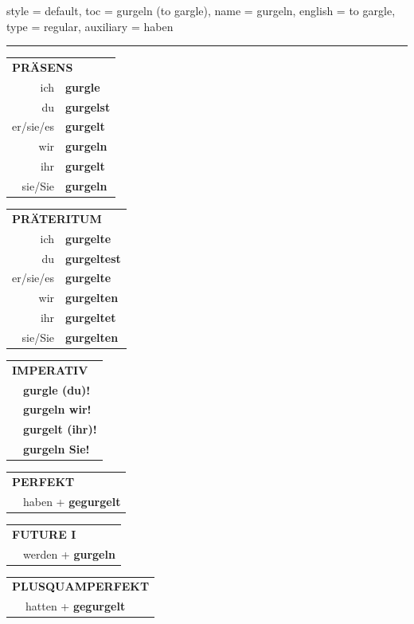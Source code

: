 \begin{verbentry}{
  style = {default},
  toc = {gurgeln (to gargle)},
  name = {gurgeln},
  english = {to gargle},
  type = {regular},
  auxiliary = {haben}
}


\vspace{5pt}
\hrule
\vspace{5pt}

\begin{tabular}{rl}
\multicolumn{2}{l}{\textbf{PRÄSENS}}\\
ich & \textbf{gurgle}\\
du & \textbf{gurgelst}\\
er/sie/es & \textbf{gurgelt}\\
wir & \textbf{gurgeln}\\
ihr & \textbf{gurgelt}\\
sie/Sie & \textbf{gurgeln}\\
\end{tabular}
\hfill
\begin{tabular}{rl}
\multicolumn{2}{l}{\textbf{PRÄTERITUM}}\\
ich & \textbf{gurgelte}\\
du & \textbf{gurgeltest}\\
er/sie/es & \textbf{gurgelte}\\
wir & \textbf{gurgelten}\\
ihr & \textbf{gurgeltet}\\
sie/Sie & \textbf{gurgelten}\\
\end{tabular}
\hfill
\begin{tabular}{rl}
\multicolumn{2}{l}{\textbf{IMPERATIV}}\\
& \textbf{gurgle (du)!}\\
& \textbf{gurgeln wir!}\\
& \textbf{gurgelt (ihr)!}\\
& \textbf{gurgeln Sie!}\\
\end{tabular}

\vspace{10pt}

\begin{tabular}{rl}
\multicolumn{2}{l}{\textbf{PERFEKT}}\\
& haben + \textbf{gegurgelt}\\
\end{tabular}
\hfill
\begin{tabular}{rl}
\multicolumn{2}{l}{\textbf{FUTURE I}}\\
& werden + \textbf{gurgeln}\\
\end{tabular}
\hfill
\begin{tabular}{rl}
\multicolumn{2}{l}{\textbf{PLUSQUAMPERFEKT}}\\
& hatten + \textbf{gegurgelt}\\
\end{tabular}


\end{verbentry}
